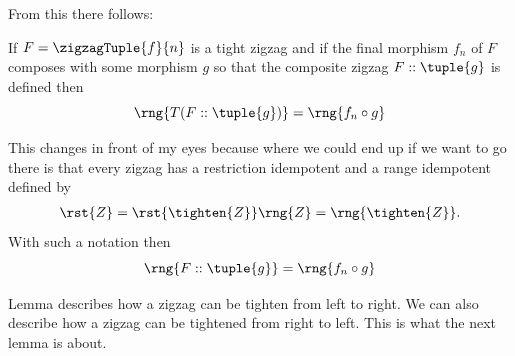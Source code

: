 \begin{oldtt}
From this there follows:
\begin{observation}
If  $F=\zigzagTuple{f}{n}$ is a tight zigzag 
and if the final morphism $f_n$ of $F$ composes with some morphism $g$
 so that the composite zigzag $F :: \tuple{g}$ is defined then
\[
\rng{T(F :: \tuple{g})}=\rng{f_n \circ g}
\]

\begin{worktt}
This changes in front of my eyes because where we could  end up if we want to go there is that
every zigzag has a restriction idempotent and a range idempotent defined by
\begin{align*}
\rst{Z} = \rst{\tighten{Z}}
\rng{Z} = \rng{\tighten{Z}}.
\end{align*} 
With such a notation then
\[
\rng{F :: \tuple{g}}=\rng{f_n \circ g}
\]
\end{worktt}
\end{observation}
\end{oldtt}
Lemma  describes how a zigzag can be tighten from left to right. We can also describe how a zigzag can be
tightened from right to left. This is what the next lemma is about.
